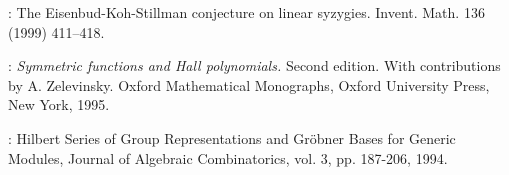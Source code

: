 \documentclass{tran-l}
\theoremstyle{plain}
\theoremstyle{remark}
\theoremstyle{definition}
\begin{document}
\begin{thebibliography}{ABW}
: The Eisenbud-Koh-Stillman conjecture on linear
syzygies. Invent. Math. 136 (1999) 411--418. 

: {\em Symmetric functions and Hall
polynomials.} Second edition. With contributions by A. Zelevinsky. Oxford
Mathematical Monographs, Oxford University Press, New York, 1995. 

: Hilbert Series of 
Group Representations and Gr\"{o}bner Bases for Generic Modules,
Journal of Algebraic Combinatorics, vol. 3, pp. 187-206, 1994. 

\end{thebibliography}
\end{document}
